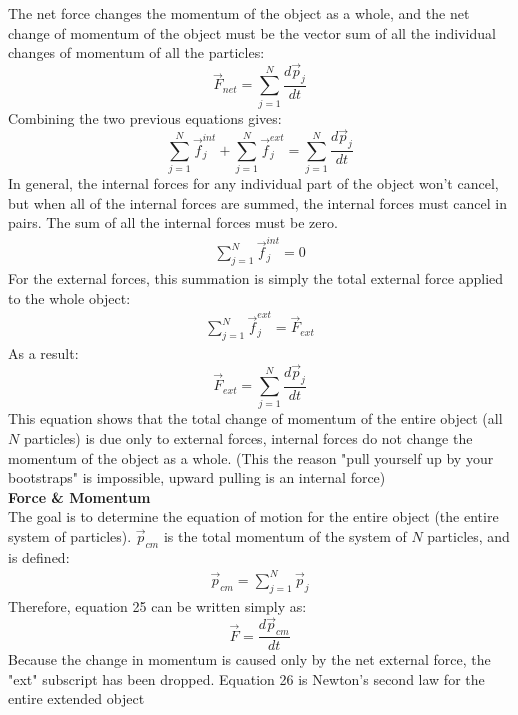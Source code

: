 \documentclass[a4paper]{article}
\let\bf\textbf
\begin{document}
The net force changes the momentum of the object as a whole, and the net change of momentum of the object must be the vector sum of all the individual changes of momentum of all the particles:
\begin{equation}
    \vec{F}_{net} = \sum_{j = 1}^{N}\frac{d\vec{p}_j}{dt}
\end{equation}
Combining the two previous equations gives:
\begin{equation}
    \sum_{j = 1}^{N}\vec{f}^{int}_j + \sum_{j = 1}^{N}\vec{f}^{ext}_j = \sum_{j = 1}^{N}\frac{d\vec{p}_j}{dt}
\end{equation}
In general, the internal forces for any individual part of the object won't cancel, but when all of the internal forces are summed, the internal forces must cancel in pairs. The sum of all the internal forces must be zero.
\begin{align*}
    \sum_{j = 1}^{N}\vec{f}^{int}_j = 0
\end{align*}
For the external forces, this summation is simply the total external force applied to the whole object:
\begin{align*}
    \sum_{j = 1}^{N}\vec{f}^{ext}_j = \vec{F}_{ext}
\end{align*}
As a result:
\begin{equation}
    \vec{F}_{ext} = \sum_{j = 1}^{N}\frac{d\vec{p}_j}{dt}
\end{equation}
This equation shows that the total change of momentum of the entire object (all $N$ particles) is due only to external forces, internal forces do not change the momentum of the object as a whole. (This the reason "pull yourself up by your bootstraps" is impossible, upward pulling is an internal force)
\vspace{2mm}\\
\bf{Force \& Momentum}
\vspace{2mm}\\
The goal is to determine the equation of motion for the entire object (the entire system of particles). $\vec{p}_{cm}$ is the total momentum of the system of $N$ particles, and is defined:
\begin{align*}
    \vec{p}_{cm} = \sum_{j = 1}^{N}\vec{p}_j
\end{align*}
Therefore, equation 25 can be written simply as:
\begin{equation}
    \vec{F} = \frac{d\vec{p}_{cm}}{dt}
\end{equation}
Because the change in momentum is caused only by the net external force, the "ext" subscript has been dropped. Equation 26 is Newton's second law for the entire extended object
\end{document}
